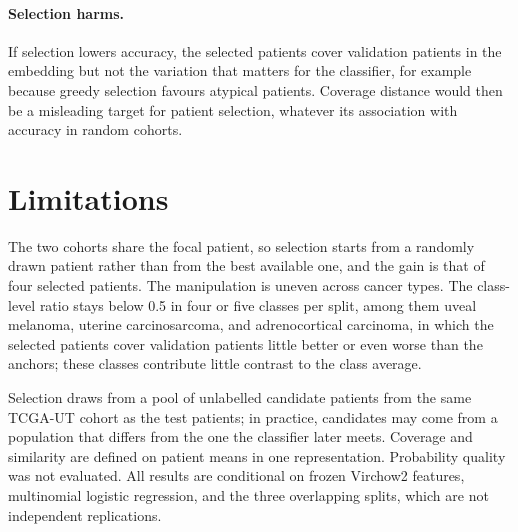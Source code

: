 \documentclass[11pt]{article}
\begin{document}
\paragraph{Selection harms.}
If selection lowers accuracy, the selected patients cover validation patients in the embedding but not the variation that matters for the classifier, for example because greedy selection favours atypical patients. Coverage distance would then be a misleading target for patient selection, whatever its association with accuracy in random cohorts.



\section{Limitations}
\label{sec:limitations}
The two cohorts share the focal patient, so selection starts from a randomly drawn patient rather than from the best available one, and the gain is that of four selected patients. The manipulation is uneven across cancer types. The class-level ratio stays below 0.5 in four or five classes per split, among them uveal melanoma, uterine carcinosarcoma, and adrenocortical carcinoma, in which the selected patients cover validation patients little better or even worse than the anchors; these classes contribute little contrast to the class average.

Selection draws from a pool of unlabelled candidate patients from the same TCGA-UT cohort as the test patients; in practice, candidates may come from a population that differs from the one the classifier later meets. Coverage and similarity are defined on patient means in one representation. Probability quality was not evaluated. All results are conditional on frozen Virchow2 features, multinomial logistic regression, and the three overlapping splits, which are not independent replications.



\end{document}
